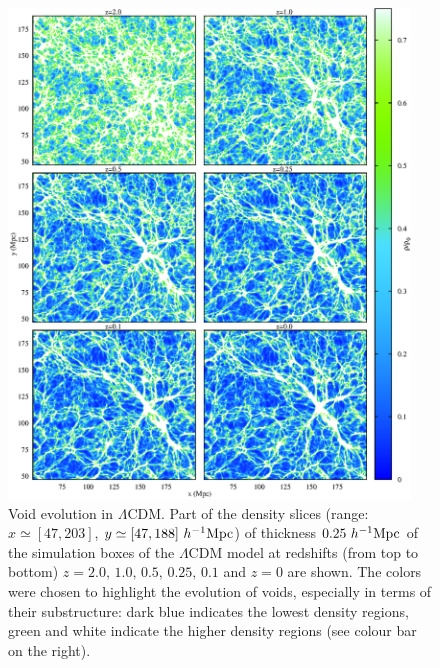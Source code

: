 \begin{figure}
\includegraphics[width=0.95\textwidth]{ch_voidsde/img/wmap-timesteps-zoom-paper}
\caption{Void evolution in $\Lambda$CDM. Part of the density slices (range: $x \simeq [47, 203]$, $y \simeq [47, 188]~h^{-1} {\rm Mpc}$) of
thickness $0.25~h^{-1} {\rm Mpc}$ of the simulation boxes of the $\Lambda$CDM model at redshifts (from top to bottom) $z=2.0,\,1.0,\,0.5,\,0.25,\,0.1$ 
and $z = 0$ are shown. The colors were chosen to highlight the evolution of voids, especially in terms of their substructure: 
dark blue indicates the lowest density regions, green and white indicate the higher density regions (see colour bar on the right).}
\label{fig:lcdm-timesteps}
\end{figure}
